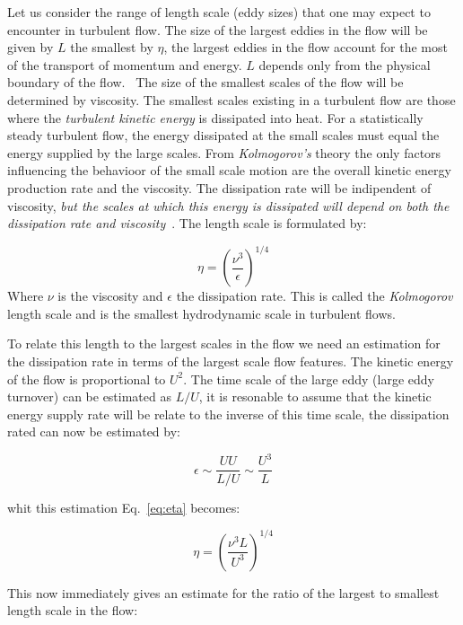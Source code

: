 Let us consider the range of length scale (eddy sizes) that one may expect to encounter in turbulent flow.
The size of the largest eddies in the flow will be given by $L$ the smallest by $\eta$, the largest eddies in the flow account for the most of the transport of momentum and energy. $L$ depends only from the physical boundary of the flow.~\cite{wilcox} 
The size of the smallest scales of the flow will be determined by viscosity. The smallest scales existing in a turbulent flow are those where the \textit{turbulent kinetic energy} is dissipated into heat.
For a statistically steady turbulent flow, the energy dissipated at the small scales must equal the energy supplied by the large scales.
From \textit{Kolmogorov's} theory the only factors influencing the behavioor of the small scale motion are the overall kinetic energy production rate and the viscosity. The dissipation rate will be indipendent of viscosity, \textit{but the scales at which this energy is dissipated will depend on both the dissipation rate and viscosity}~\cite{pope}. 
The length scale is formulated by:

\begin{equation}
\eta = \left( \frac{\nu^3}{\epsilon}\right)^{1/4}
\label{eq:eta}
\end{equation}
Where $\nu$ is the viscosity and $\epsilon$ the dissipation rate.
This is called the \textit{Kolmogorov} length scale and is the smallest hydrodynamic scale in turbulent flows. 

To relate this length to the largest scales in the flow we need an estimation for the dissipation rate in terms of the largest scale flow features. 
The kinetic energy of the flow is proportional to $U^2$.
The time scale of the large eddy (large eddy turnover) can be estimated as $L/U$, it is resonable to assume that the kinetic energy supply rate will be relate to the inverse of this time scale, the dissipation rated can now be estimated by:

\begin{equation}
\epsilon \sim \frac{U U}{L/U} \sim \frac{U^3}{L}
\label{eq:epsilon}
\end{equation}

whit this estimation Eq.~\ref{eq:eta} becomes: 

\begin{equation}
\eta=\left(\frac{\nu^3 L}{U^3} \right)^{1/4}
\label{eq:eta2}
\end{equation}

This now immediately gives an estimate for the ratio of the largest to smallest length scale in the flow:

